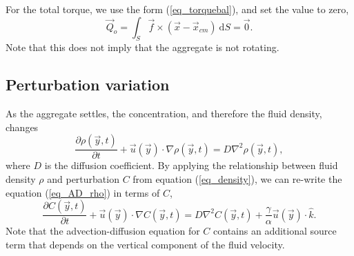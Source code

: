 For the total torque, we use the form (\ref{eq_torquebal}), and set the value to zero,
\begin{equation}
	\vec{Q}_o =\int_S \vec{f}\times (\vec{x} - \vec{x}_{cm}) \ \textrm{d}S =  \vec{0}.
\label{eq_Qo}
\end{equation}
 Note that this does not imply that the aggregate is not rotating. 
\subsection{Perturbation variation}
As the aggregate settles, the concentration, and therefore the fluid density, changes
\begin{equation}
	\frac{\partial \rho(\vec{y},t)}{\partial t}
	+ \vec{u}(\vec{y}) \cdot \nabla \rho(\vec{y},t)
	 = D \nabla^2 \rho(\vec{y},t),
\label{eq_AD_rho}
\end{equation}
where $D$ is the diffusion coefficient.
By applying the relationship between fluid density $\rho$ and perturbation $C$ from equation (\ref{eq_density}), we can re-write the equation (\ref{eq_AD_rho}) in terms of $C$, 
\begin{equation}
	\frac{\partial C(\vec{y},t)}{\partial t}
	+ \vec{u}(\vec{y}) \cdot \nabla C(\vec{y},t)
	 = D \nabla^2 C(\vec{y},t)
	 + \frac{\gamma}{\alpha}\vec{u}(\vec{y})  \cdot \hat{k}.
\label{eq_AD_C}
\end{equation}
Note that the advection-diffusion equation for $C$ contains an additional source term that
depends on the vertical component of the fluid velocity.

